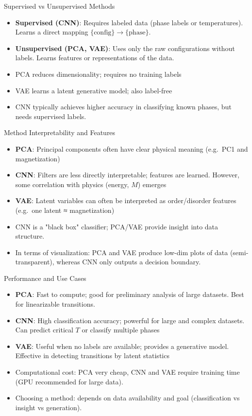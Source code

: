\documentclass{beamer}
\begin{document}
\begin{frame}{Supervised vs Unsupervised Methods}
 \begin{itemize}
   \item \textbf{Supervised (CNN)}: Requires labeled data (phase labels or temperatures). Learns a direct mapping $\{\text{config}\}\to\{\text{phase}\}$.
   \item \textbf{Unsupervised (PCA, VAE)}: Uses only the raw configurations without labels. Learns features or representations of the data.
   \item PCA reduces dimensionality; requires no training labels 
   \item VAE learns a latent generative model; also label-free 
   \item CNN typically achieves higher accuracy in classifying known phases, but needs supervised labels.
 \end{itemize}
\end{frame}

\begin{frame}{Method Interpretability and Features}
 \begin{itemize}
   \item \textbf{PCA}: Principal components often have clear physical meaning (e.g.\ PC1 and  magnetization) 
   \item \textbf{CNN}: Filters are less directly interpretable; features are learned. However, some correlation with physics (energy, $M$) emerges 
   \item \textbf{VAE}: Latent variables can often be interpreted as order/disorder features (e.g.\ one latent ≈ magnetization) 
   \item CNN is a "black box" classifier; PCA/VAE provide insight into data structure.
   \item In terms of visualization: PCA and VAE produce low-dim plots of data (semi-transparent), whereas CNN only outputs a decision boundary.
 \end{itemize}
\end{frame}

\begin{frame}{Performance and Use Cases}
 \begin{itemize}
   \item \textbf{PCA}: Fast to compute; good for preliminary analysis of large datasets. Best for linearizable transitions.
   \item \textbf{CNN}: High classification accuracy; powerful for large and complex datasets. Can predict critical $T$ or classify multiple phases 
   \item \textbf{VAE}: Useful when no labels are available; provides a generative model. Effective in detecting transitions by latent statistics 
   \item Computational cost: PCA very cheap, CNN and VAE require training time (GPU recommended for large data).
   \item Choosing a method: depends on data availability and goal (classification vs insight vs generation).
 \end{itemize}
\end{frame}
\end{document}
